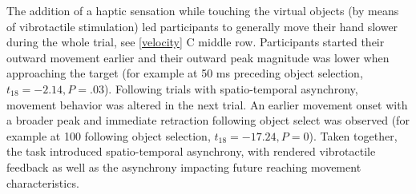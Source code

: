 The addition of a haptic sensation while touching the virtual objects (by means of vibrotactile stimulation) led participants to generally move their hand slower during the whole trial, see \ref{velocity} C middle row. Participants started their outward movement earlier and their outward peak magnitude was lower when approaching the target (for example at 50 ms preceding object selection, $t_{18} = -2.14, P = .03$). Following trials with spatio-temporal asynchrony, movement behavior was altered in the next trial. An earlier movement onset with a broader peak and immediate retraction following object select was observed (for example at 100 following object selection, $t_{18} = -17.24, P = 0$). Taken together, the task introduced spatio-temporal asynchrony, with rendered vibrotactile feedback as well as the asynchrony impacting future reaching movement characteristics.